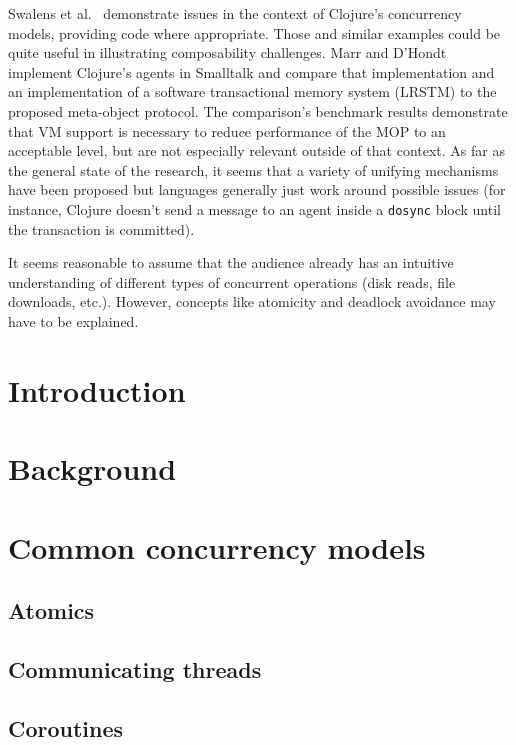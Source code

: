 \documentclass{sig-alternate}
\newcommand{\code}[1]{\texttt{#1}}
\begin{document}
Swalens et al.~\cite{Swalens2014} demonstrate issues in the context of Clojure's concurrency models, providing code where appropriate. Those and similar examples could be quite useful in illustrating composability challenges. Marr and D'Hondt~\cite{Marr2012} implement Clojure's agents in Smalltalk and compare that implementation and an implementation of a software transactional memory system (LRSTM) to the proposed meta-object protocol. The comparison's benchmark results demonstrate that VM support is necessary to reduce performance of the MOP to an acceptable level, but are not especially relevant outside of that context. As far as the general state of the research, it seems that a variety of unifying mechanisms have been proposed but languages generally just work around possible issues (for instance, Clojure doesn't send a message to an agent inside a \code{dosync} block until the transaction is committed).

It seems reasonable to assume that the audience already has an intuitive understanding of different types of concurrent operations (disk reads, file downloads, etc.). However, concepts like atomicity and deadlock avoidance may have to be explained.

\section{Introduction}

\section{Background}

\section{Common concurrency models}

\subsection{Atomics}

\subsection{Communicating threads}

\subsection{Coroutines}
\end{document}
